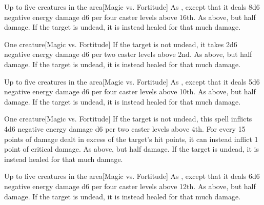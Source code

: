 \begin{spelltargets}{Up to five creatures in the area}[Magic vs. Fortitude]
    \spellsuccess As , except that it deals 8d6 negative energy damage \add d6 per four caster levels above 16th.
    \spellfailure As above, but half damage.
    \spelleffect If the target is undead, it is instead healed for that much damage.
\end{spelltargets}

\spellrng{\rngclose}
\begin{spelltarget}{One creature}[Magic vs. Fortitude]
    \spellsuccess If the target is not undead, it takes 2d6 negative energy damage \add d6 per two caster levels above 2nd.
    \spellfailure As above, but half damage.
    \spelleffect If the target is undead, it is instead healed for that much damage.
\end{spelltarget}

\begin{spelltargets}{Up to five creatures in the area}[Magic vs. Fortitude]
    \spellsuccess As , except that it deals 5d6 negative energy damage \add d6 per four caster levels above 10th.
    \spellfailure As above, but half damage.
    \spelleffect If the target is undead, it is instead healed for that much damage.
\end{spelltargets}

\spellrng{\rngclose}
\begin{spelltarget}{One creature}[Magic vs. Fortitude]
    \spellsuccess If the target is not undead, this spell inflicts 4d6 negative energy damage \add d6 per two caster levels above 4th. For every 15 points of damage dealt in excess of the target's hit points, it can instead inflict 1 point of critical damage.
    \spellfailure As above, but half damage.
    \spelleffect If the target is undead, it is instead healed for that much damage.
\end{spelltarget}

\begin{spelltargets}{Up to five creatures in the area}[Magic vs. Fortitude]
    \spellsuccess As , except that it deals 6d6 negative energy damage \add d6 per four caster levels above 12th.
    \spellfailure As above, but half damage.
    \spelleffect If the target is undead, it is instead healed for that much damage.
\end{spelltargets}

